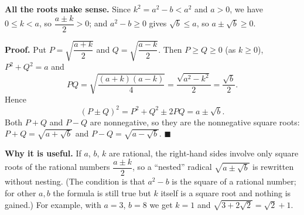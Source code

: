 \textbf{All the roots make sense.} Since $k^2=a^2-b<a^2$ and $a>0$, we have $0\le k<a$, so $\dfrac{a\pm k}{2}>0$; and $a^2-b\ge0$ gives $\sqrt b\le a$, so $a\pm\sqrt b\ge0$.

\textbf{Proof.} Put $P=\sqrt{\dfrac{a+k}{2}}$ and $Q=\sqrt{\dfrac{a-k}{2}}$. Then $P\ge Q\ge0$ (as $k\ge0$), $P^2+Q^2=a$ and
\[PQ=\sqrt{\dfrac{(a+k)(a-k)}{4}}=\dfrac{\sqrt{a^2-k^2}}{2}=\dfrac{\sqrt b}{2}.\]
Hence
\[(P\pm Q)^2=P^2+Q^2\pm2PQ=a\pm\sqrt b.\]
Both $P+Q$ and $P-Q$ are nonnegative, so they are the nonnegative square roots: $P+Q=\sqrt{a+\sqrt b}$ and $P-Q=\sqrt{a-\sqrt b}$. $\blacksquare$

\textbf{Why it is useful.} If $a$, $b$, $k$ are rational, the right-hand sides involve only square roots of the rational numbers $\dfrac{a\pm k}{2}$, so a ``nested'' radical $\sqrt{a\pm\sqrt b}$ is rewritten without nesting. (The condition is that $a^2-b$ is the square of a rational number; for other $a,b$ the formula is still true but $k$ itself is a square root and nothing is gained.) For example, with $a=3$, $b=8$ we get $k=1$ and $\sqrt{3+2\sqrt2}=\sqrt2+1$.
